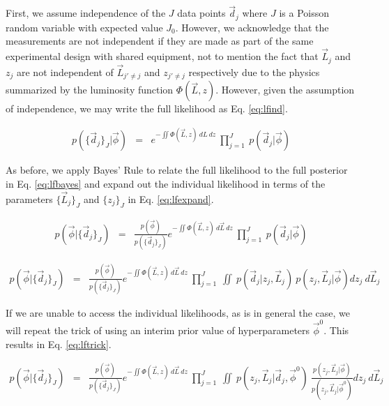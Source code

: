 \documentclass[preprint]{aastex}
\begin{document}
First, we assume independence of the $J$ data points $\vec{d}_{j}$ where $J$ is a Poisson random variable with expected value $J_{0}$.  However, we acknowledge that the measurements are not independent if they are made as part of the same experimental design with shared equipment, not to mention the fact that $\vec{L}_{j}$ and $z_{j}$ are not independent of $\vec{L}_{j'\neq j}$ and $z_{j'\neq j}$ respectively due to the physics summarized by the luminosity function $\Phi(\vec{L},z)$.  However, given the assumption of independence, we may write the full likelihood as Eq. \ref{eq:lfind}.  

\begin{eqnarray}
\label{eq:lfind}
p(\{\vec{d}_{j}\}_{J}|\vec{\phi}) &=& e^{-\iint \Phi(\vec{L},z)\ dL\ dz}\ \prod_{j=1}^{J}\ p(\vec{d}_{j}|\vec{\phi})
\end{eqnarray}

As before, we apply Bayes' Rule to relate the full likelihood to the full posterior in Eq. \ref{eq:lfbayes} and expand out the individual likelihood in terms of the parameters $\{\vec{L}_{j}\}_{J}$ and $\{z_{j}\}_{J}$ in Eq. \ref{eq:lfexpand}.

\begin{eqnarray}
\label{eq:lfbayes}
p(\vec{\phi}|\{\vec{d}_{j}\}_{J}) &=& \frac{p(\vec{\phi})}{p(\{\vec{d}_{j}\}_{J})}e^{-\iint \Phi(\vec{L},z)\ d\vec{L}\ dz}\ \prod_{j=1}^{J}\ p(\vec{d}_{j}|\vec{\phi})
\end{eqnarray}

\begin{eqnarray}
\label{eq:lfexpand}
p(\vec{\phi}|\{\vec{d}_{j}\}_{J}) &=& \frac{p(\vec{\phi})}{p(\{\vec{d}_{j}\}_{J})}e^{-\iint \Phi(\vec{L},z)\ d\vec{L}\ dz}\ \prod_{j=1}^{J}\ \iint\ p(\vec{d}_{j}|z_{j},\vec{L}_{j})\ p(z_{j},\vec{L}_{j}|\vec{\phi}) dz_{j}\ d\vec{L}_{j}
\end{eqnarray}

If we are unable to access the individual likelihoods, as is in general the case, we will repeat the trick of using an interim prior value of hyperparameters $\vec{\phi}^{0}$.  This results in Eq. \ref{eq:lftrick}.

\begin{eqnarray}
\label{eq:lftrick}
p(\vec{\phi}|\{\vec{d}_{j}\}_{J}) &=& \frac{p(\vec{\phi})}{p(\{\vec{d}_{j}\}_{J})}e^{-\iint \Phi(\vec{L},z)\ d\vec{L}\ dz}\ \prod_{j=1}^{J}\ \iint\ p(z_{j},\vec{L}_{j}|\vec{d}_{j},\vec{\phi}^{0})\ \frac{p(z_{j},\vec{L}_{j}|\vec{\phi})}{p(z_{j},\vec{L}_{j}|\vec{\phi}^{0})} dz_{j}\ d\vec{L}_{j}
\end{eqnarray}
\end{document}
